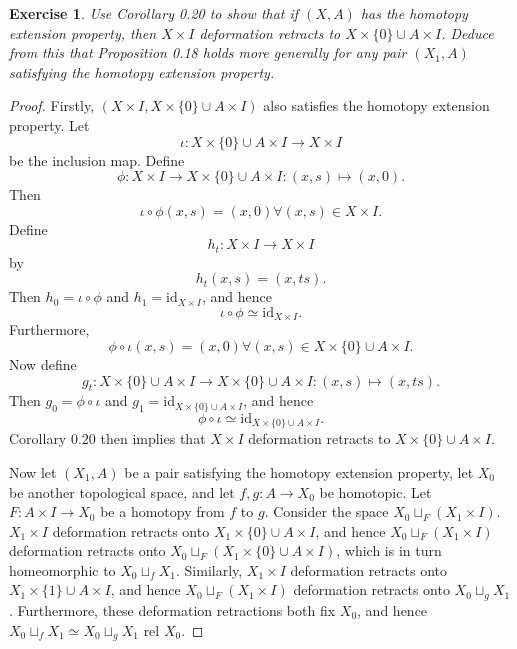 \documentclass{article}
\newtheorem{exercise}[theorem]{Exercise}
\begin{document}
\begin{exercise}
Use Corollary 0.20 to show that if $(X,A)$ has the homotopy extension property, then $X\times I$ deformation retracts to $X\times\{0\}\cup A\times I$. Deduce from this that Proposition 0.18 holds more generally for any pair $(X_1,A)$ satisfying the homotopy extension property.
\end{exercise}
\begin{proof}
Firstly, $(X\times I, X\times\{0\}\cup A\times I)$ also satisfies the homotopy extension property. Let \[\iota:X\times\{0\}\cup A\times I\to X\times I\] be the inclusion map. Define \[\phi:X\times I\to X\times\{0\}\cup A\times I:(x,s)\mapsto(x,0).\] Then \[\iota\circ \phi(x,s)=(x,0)\forall (x,s)\in X\times I.\] Define \[h_t:X\times I\to X\times I\] by \[h_t(x,s)=(x,ts).\] Then $h_0=\iota\circ\phi$ and $h_1=\text{id}_{X\times I}$, and hence \[\iota\circ\phi\simeq\text{id}_{X\times I}.\] Furthermore, \[\phi\circ\iota(x,s)=(x,0)\forall (x,s)\in X\times \{0\}\cup A\times I.\] Now define \[g_t:X\times\{0\}\cup A\times I\to X\times\{0\}\cup A\times I:(x,s)\mapsto(x,ts).\] Then $g_0=\phi\circ\iota$ and $g_1=\text{id}_{X\times\{0\}\cup A\times I}$, and hence \[\phi\circ\iota\simeq \text{id}_{X\times\{0\}\cup A\times I}.\] Corollary $0.20$ then implies that $X\times I$ deformation retracts to $X\times\{0\}\cup A\times I$.\newline


Now let $(X_1,A)$ be a pair satisfying the homotopy extension property, let $X_0$ be another topological space, and let $f,g:A\to X_0$ be homotopic. Let $F:A\times I\to X_0$ be a homotopy from $f$ to $g$. Consider the space $X_0\sqcup_F(X_1\times I)$. $X_1\times I$ deformation retracts onto $X_1\times\{0\}\cup A\times I$, and hence $X_0\sqcup_F(X_1\times I)$ deformation retracts onto $X_0\sqcup_F(X_1\times\{0\}\cup A\times I)$, which is in turn homeomorphic to $X_0\sqcup_fX_1$. Similarly, $X_1\times I$ deformation retracts onto $X_1\times\{1\}\cup A\times I$, and hence $X_0\sqcup_F(X_1\times I)$ deformation retracts onto $X_0\sqcup_gX_1$. Furthermore, these deformation retractions both fix $X_0$, and hence $X_0\sqcup_fX_1\simeq X_0\sqcup_gX_1\text{ rel }X_0$.
\end{proof}
\end{document}
